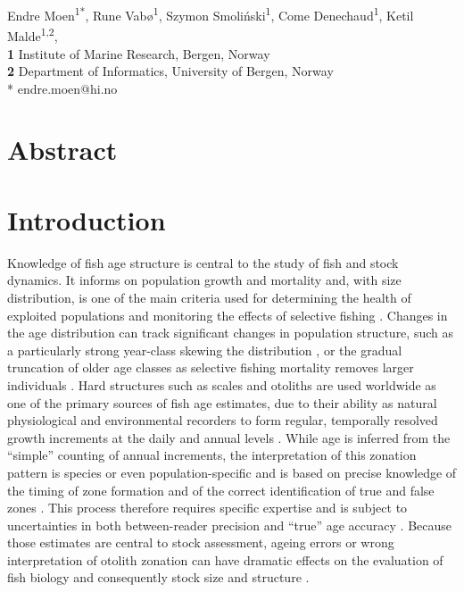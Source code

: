 \documentclass[10pt,letterpaper]{article}
\begin{document}
\vspace*{0.2in}

\begin{flushleft}
{\Large
\textbf{}
}
\newline


Endre Moen\textsuperscript{1*},
Rune Vabø\textsuperscript{1},
Szymon Smoliński\textsuperscript{1},
Come Denechaud\textsuperscript{1},
Ketil Malde\textsuperscript{1,2},
\\
\bigskip
\textbf{1} Institute of Marine Research, Bergen, Norway
\\
\textbf{2} Department of Informatics, University of Bergen, Norway
\\
\bigskip
* endre.moen@hi.no

\end{flushleft}

\linenumbers

\section*{Abstract}




\section*{Introduction}

Knowledge of fish age structure is central to the study of fish and stock dynamics. It informs on population growth and mortality and, with size distribution, is one of the main criteria used for determining the health of exploited populations and monitoring the effects of selective fishing \citep{Hidalgo, Brunel}. Changes in the age distribution can track significant changes in population structure, such as a particularly strong year-class skewing the distribution \citep{Reglero}, or the gradual truncation of older age classes as selective fishing mortality removes larger individuals \citep{Siskey}.
Hard structures such as scales and otoliths are used worldwide as one of the primary sources of fish age estimates, due to their ability as natural physiological and environmental recorders to form regular, temporally resolved growth increments at the daily and annual levels \citep{campana2001accuracy, Francis, Albuquerque}. While age is inferred from the “simple” counting of annual increments, the interpretation of this zonation pattern is species or even population-specific \citep{Hoeie} and is based on precise knowledge of the timing of zone formation and of the correct identification of true and false zones \citep{Panfili}. This process therefore requires specific expertise and is subject to uncertainties in both between-reader precision and “true” age accuracy \citep{Francis}. Because those estimates are central to stock assessment, ageing errors or wrong interpretation of otolith zonation can have dramatic effects on the evaluation of fish biology and consequently stock size and structure \citep{Tyler, Beamish, Ragonese}. 
\end{document}
